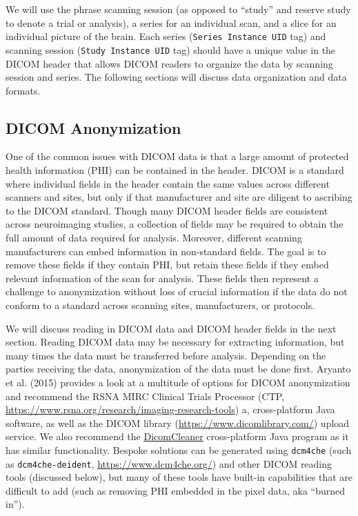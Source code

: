 \documentclass[utf8]{frontiersSCNS}
\begin{document}
We will use the phrase scanning session (as opposed to ``study'' and reserve study to denote a trial or analysis), a series for an individual scan, and a slice for an individual picture of the brain. Each series (\texttt{Series\ Instance\ UID} tag) and scanning session (\texttt{Study\ Instance\ UID} tag) should have a unique value in the DICOM header that allows DICOM readers to organize the data by scanning session and series. The following sections will discuss data organization and data formats.

\hypertarget{dicom-anonymization}{%
\subsection{DICOM Anonymization}\label{dicom-anonymization}}

One of the common issues with DICOM data is that a large amount of protected health information (PHI) can be contained in the header. DICOM is a standard where individual fields in the header contain the same values across different scanners and sites, but only if that manufacturer and site are diligent to ascribing to the DICOM standard. Though many DICOM header fields are consistent across neuroimaging studies, a collection of fields may be required to obtain the full amount of data required for analysis. Moreover, different scanning manufacturers can embed information in non-standard fields. The goal is to remove these fields if they contain PHI, but retain these fields if they embed relevant information of the scan for analysis. These fields then represent a challenge to anonymization without loss of crucial information if the data do not conform to a standard across scanning sites, manufacturers, or protocols.

We will discuss reading in DICOM data and DICOM header fields in the next section. Reading DICOM data may be necessary for extracting information, but many times the data must be transferred before analysis. Depending on the parties receiving the data, anonymization of the data must be done first. Aryanto et al. (2015) provides a look at a multitude of options for DICOM anonymization and recommend the RSNA MIRC Clinical Trials Processor (CTP, \url{https://www.rsna.org/research/imaging-research-tools}) a, cross-platform Java software, as well as the DICOM library (\url{https://www.dicomlibrary.com/}) upload service. We also recommend the \href{https://www.dclunie.com/pixelmed/software/webstart/DicomCleanerUsage.html}{DicomCleaner} cross-platform Java program as it has similar functionality. Bespoke solutions can be generated using \texttt{dcm4che} (such as \texttt{dcm4che-deident}, \url{https://www.dcm4che.org/}) and other DICOM reading tools (discussed below), but many of these tools have built-in capabilities that are difficult to add (such as removing PHI embedded in the pixel data, aka ``burned in'').
\end{document}
